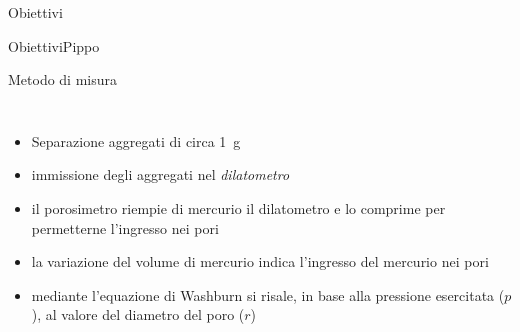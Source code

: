 \documentclass[10pt]{beamer}
\begin{document}
\begin{frame}{Obiettivi}
\begin{frame}{Obiettivi}{Pippo}
\begin{frame}{Metodo di misura}
  \begin{columns}
    \begin{itemize}[<+->]
    \item Separazione aggregati di circa \SI{1}{\gram}
    \item immissione degli aggregati nel \emph{dilatometro}
    \item il porosimetro riempie di mercurio il dilatometro e lo
      comprime per permetterne l'ingresso nei pori
    \item la variazione del volume di mercurio indica l'ingresso del
      mercurio nei pori 
    \item mediante l'equazione di Washburn si risale, in base alla
      pressione esercitata ($p$), al valore del diametro del poro ($r$)
    \end{itemize}
  \end{columns}
\end{frame}




\end{frame}
\end{frame}
\end{document}
